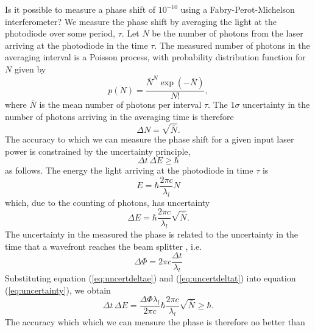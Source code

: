 Is it possible to measure a phase shift of $10^{-10}$ using a
Fabry-Perot-Michelson interferometer? We measure the phase shift by averaging
the light at the photodiode over some period, $\tau$. Let $N$ be the number of
photons from the laser arriving at the photodiode in the time $\tau$. The
measured number of photons in the averaging interval is a Poisson process,
with probability distribution function for $N$ given by
\begin{equation}
p(N) = \frac{ \bar{N} ^{N} \exp \left(-\bar{N}\right) } {N!},
\end{equation}
where $\bar{N}$ is the mean number of photons per interval $\tau$.
The $1\sigma$ uncertainty in the number of photons arriving in the averaging
time is therefore
\begin{equation}
\Delta N = \sqrt{\bar{N}}.
\end{equation}
The accuracy to which we can measure the phase shift for a given input
laser power is constrained by the uncertainty principle,
\begin{equation}
\Delta t \, \Delta E \ge \hbar
\label{eq:uncertainty}
\end{equation}
as follows. The energy the light arriving at the photodiode in time $\tau$ is
\begin{equation}
E = \hbar \frac{2\pi c}{\lambda_l} N
\end{equation}
which, due to the counting of photons, has uncertainty 
\begin{equation}
\Delta E = \hbar \frac{2\pi c}{\lambda_l} \sqrt{\bar{N}}.
\label{eq:uncertdeltae}
\end{equation}
The uncertainty in the measured the phase is related to the uncertainty
in the time that a wavefront reaches the beam splitter , i.e.
\begin{equation}
\Delta\Phi = 2\pi c \frac{\Delta t }{ \lambda_l }
\label{eq:uncertdeltat}
\end{equation}
Substituting equation (\ref{eq:uncertdeltae}) and (\ref{eq:uncertdeltat})
into equation (\ref{eq:uncertainty}), we obtain
\begin{equation}
\Delta t \, \Delta E = \frac{\Delta \Phi \lambda_l}{2\pi c} \hbar \frac{2\pi
c}{\lambda_l} \sqrt{\bar{N}} \ge \hbar.
\end{equation}
The accuracy which which we can measure the phase is therefore no better than
